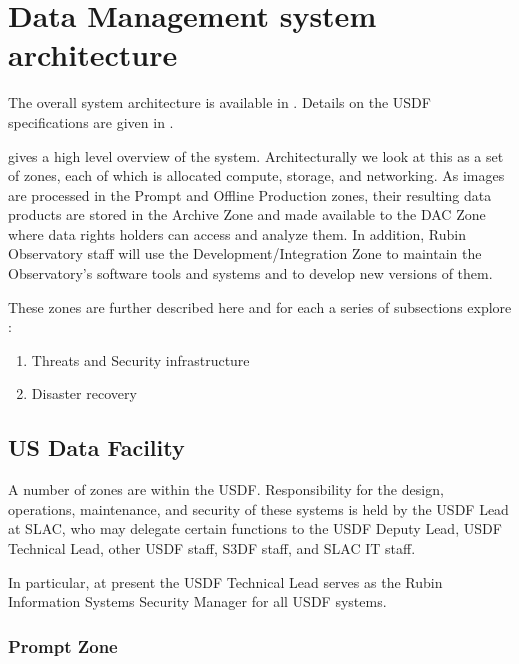 

\section{Data Management system architecture} \label{sec:dparc}
The overall system architecture is available in .
Details on the \gls{USDF} specifications are given in .

 gives a high level overview of the system. Architecturally we look
at this as a set of zones, each of which is allocated compute, storage, and networking.
As images are processed in the Prompt and Offline Production zones, their resulting data products are stored in the \gls{Archive} \gls{Zone} and made available to the \gls{DAC} \gls{Zone} where data rights holders can access and analyze them.
In addition, Rubin Observatory staff will use the Development/Integration \gls{Zone} to maintain the Observatory's \gls{software} tools and systems and to develop new versions of them.

These zones are further described here and for each a series of subsections explore :


\begin{enumerate}
\item Threats and Security infrastructure
\item Disaster recovery
\end{enumerate}

\subsection{US Data Facility}\label{sec:usdf}

A number of zones are within the \gls{USDF}.
Responsibility for the design, operations, maintenance, and security of these systems is held by the \gls{USDF} Lead at SLAC, who may delegate certain functions to the \gls{USDF} Deputy Lead, \gls{USDF} Technical Lead, other \gls{USDF} staff, S3DF staff, and SLAC IT staff.

In particular, at present the USDF Technical Lead serves as the Rubin Information Systems Security Manager for all USDF systems.

\subsubsection{Prompt Zone} \label{sec:promptenc}

